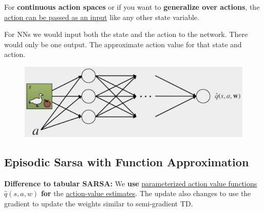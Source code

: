 \documentclass[12pt, a4paper]{article}
\begin{document}
For \textbf{continuous action spaces} or if you want to \textbf{generalize over actions}, the \uline{action can be passed as an input} like any other state variable.

For NNs we would input both the state and the action to the network. There would only be one output. The approximate action value for that state and action.

\begin{figure}[H]
  \centering
    \includegraphics[width=0.6\columnwidth]{images/action-values-with-ann.png}
    \label{fig:action-values-with-ann}
\end{figure}









\subsection{Episodic Sarsa with Function Approximation}\label{episodic-sarsa-with-function-approximation}

\textbf{Difference to tabular SARSA:}
We \textbf{use} \uline{parameterized action value functions $\hat{q}(s,a,w)$} \textbf{for} the \uline{action-value estimates}. The update also changes to use the gradient to update the weights similar to semi-gradient TD.
\end{document}
